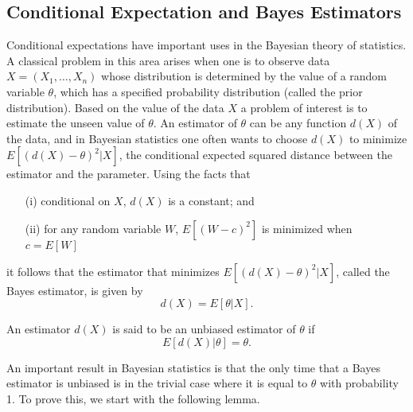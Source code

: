 \documentclass[lang=cn,10pt]{elegantbook}
\begin{document}
\subsection{Conditional Expectation and Bayes Estimators}
Conditional expectations have important uses in the Bayesian theory of statistics. A classical problem in this area arises when one is to observe data $X = (X_1, \ldots, X_n)$ whose distribution is determined by the value of a random variable $\theta$, which has a specified probability distribution (called the prior distribution). Based on the value of the data $X$ a problem of interest is to estimate the unseen value of $\theta$. An estimator of $\theta$ can be any function $d(X)$ of the data, and in Bayesian statistics one often wants to choose $d(X)$ to minimize $E[(d(X) - \theta)^2 | X]$, the conditional expected squared distance between the estimator and the parameter. Using the facts that

\begin{itemize}
    \item[(i)] conditional on $X$, $d(X)$ is a constant; and
    \item[(ii)] for any random variable $W$, $E[(W - c)^2]$ is minimized when $c = E[W]$
\end{itemize}
it follows that the estimator that minimizes $E[(d(X) - \theta)^2 | X]$, called the Bayes estimator, is given by
\[
d(X) = E[\theta | X].
\]

An estimator $d(X)$ is said to be an unbiased estimator of $\theta$ if
\[
E[d(X) | \theta] = \theta.
\]

An important result in Bayesian statistics is that the only time that a Bayes estimator is unbiased is in the trivial case where it is equal to $\theta$ with probability 1. To prove this, we start with the following lemma.
\end{document}

